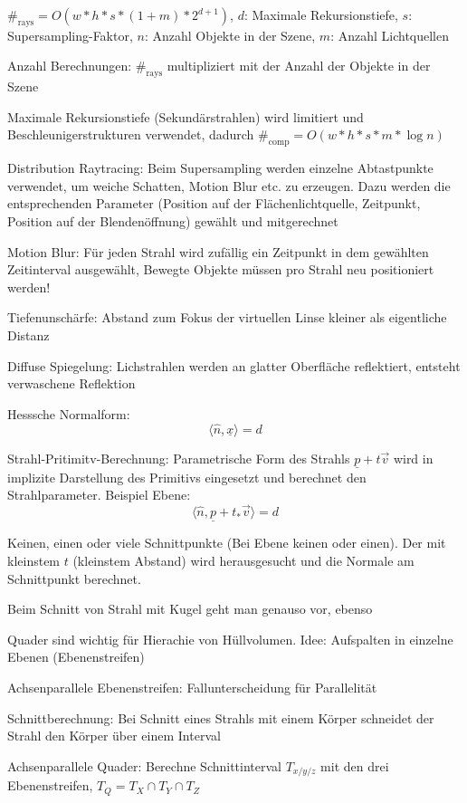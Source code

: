 \documentclass[12pt,landscape]{article}
\begin{document}
\begin{multicols}{3}
\begin{compactitem}
\item $\#_{\text{rays}} =  O(w*h*s*(1+m)*2^{d+1})$, $d$: Maximale Rekursionstiefe, $s$: Supersampling-Faktor, $n$: Anzahl Objekte in der Szene, $m$: Anzahl Lichtquellen
\item Anzahl Berechnungen: $\#_{\text{rays}}$ multipliziert mit der Anzahl der Objekte in der Szene
\item Maximale Rekursionstiefe (Sekundärstrahlen) wird limitiert und Beschleunigerstrukturen verwendet, dadurch $\#_{\text{comp}} = O(w * h * s * m * \log n)$
\item Distribution Raytracing: Beim Supersampling werden einzelne Abtastpunkte verwendet, um weiche Schatten, Motion Blur etc. zu erzeugen. Dazu werden die entsprechenden Parameter (Position auf der Flächenlichtquelle, Zeitpunkt, Position auf der Blendenöffnung) gewählt und mitgerechnet
\item Motion Blur: Für jeden Strahl wird zufällig ein Zeitpunkt in dem gewählten Zeitinterval ausgewählt, Bewegte Objekte müssen pro Strahl neu positioniert werden!
\item Tiefenunschärfe: Abstand zum Fokus der virtuellen Linse kleiner als eigentliche Distanz
\item Diffuse Spiegelung: Lichstrahlen werden an glatter Oberfläche reflektiert, entsteht verwaschene Reflektion
\item Hesssche Normalform: \[
	\langle \hat{n}, \underline{x} \rangle = d
\]
\item Strahl-Pritimitv-Berechnung: Parametrische Form des Strahls $\underline{p} + t\vec{v}$ wird in implizite Darstellung des Primitivs eingesetzt und berechnet den Strahlparameter. Beispiel Ebene:
\[ \langle \hat{n}, \underline{p} + t_{*}\vec{v}  \rangle = d \]
\item Keinen, einen oder viele Schnittpunkte (Bei Ebene keinen oder einen). Der mit kleinstem $t$ (kleinstem Abstand) wird herausgesucht und die Normale am Schnittpunkt berechnet.
\item Beim Schnitt von Strahl mit Kugel geht man genauso vor, ebenso 
\item Quader sind wichtig für Hierachie von Hüllvolumen. Idee: Aufspalten in einzelne Ebenen (Ebenenstreifen)
\item Achsenparallele Ebenenstreifen: Fallunterscheidung für Parallelität
\item Schnittberechnung: Bei Schnitt eines Strahls mit einem Körper schneidet der Strahl den Körper über einem Interval
\item Achsenparallele Quader: Berechne Schnittinterval $T_{x/y/z}$ mit den drei Ebenenstreifen, $T_Q = T_X \cap T_Y \cap T_Z$

\end{compactitem}
\end{multicols}
\end{document}
